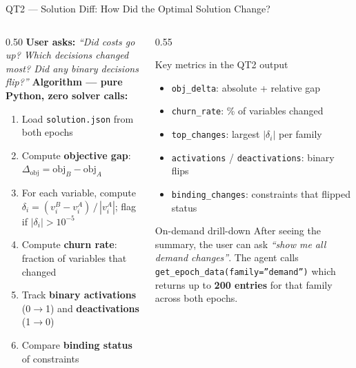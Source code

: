 \documentclass[aspectratio=169,10pt]{beamer}
\begin{document}
\begin{frame}[t]{QT2 — Solution Diff: How Did the Optimal Solution Change?}
\vspace{2pt}
\begin{columns}[T]
  \begin{column}{0.50\textwidth}
    \small\textbf{User asks:}
    \emph{``Did costs go up? Which decisions changed most? Did any binary decisions flip?''}
    \vspace{5pt}
    \textbf{Algorithm — pure Python, zero solver calls:}
    \begin{enumerate}\setlength\itemsep{3pt}
      \item Load \texttt{solution.json} from both epochs
      \item Compute \textbf{objective gap}:
            $\Delta_{\text{obj}} = \text{obj}_B - \text{obj}_A$
      \item For each variable, compute
            $\delta_i = (v_i^B - v_i^A)\,/\,|v_i^A|$;
            flag if $|\delta_i| > 10^{-5}$
      \item Compute \textbf{churn rate}: fraction of
            variables that changed
      \item Track \textbf{binary activations} (0$\to$1)
            and \textbf{deactivations} (1$\to$0)
      \item Compare \textbf{binding status} of constraints
    \end{enumerate}
  \end{column}
  \begin{column}{0.55\textwidth}
    \begin{block}{Key metrics in the QT2 output}
      \begin{itemize}\setlength\itemsep{3pt}
        \item \texttt{obj\_delta}: absolute + relative gap
        \item \texttt{churn\_rate}: \% of variables changed
        \item \texttt{top\_changes}: largest $|\delta_i|$ per family
        \item \texttt{activations} / \texttt{deactivations}: binary flips
        \item \texttt{binding\_changes}: constraints that flipped status
      \end{itemize}
    \end{block}
    \vspace{5pt}
    \begin{exampleblock}{On-demand drill-down}
      \small After seeing the summary, the user can ask
      \emph{``show me all demand changes''}.
      The agent calls \texttt{get\_epoch\_data(family=''demand'')}
      which returns up to \textbf{200 entries} for that
      family across both epochs.
    \end{exampleblock}
  \end{column}
\end{columns}
\end{frame}
\end{document}

